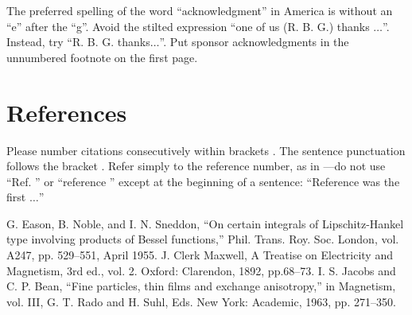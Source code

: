 \documentclass[conference]{IEEEtran}
\begin{document}
The preferred spelling of the word ``acknowledgment'' in America is without 
an ``e'' after the ``g''. Avoid the stilted expression ``one of us (R. B. 
G.) thanks $\ldots$''. Instead, try ``R. B. G. thanks$\ldots$''. Put sponsor 
acknowledgments in the unnumbered footnote on the first page.

\section*{References}

Please number citations consecutively within brackets \cite{b1}. The 
sentence punctuation follows the bracket \cite{b2}. Refer simply to the reference 
number, as in \cite{b3}---do not use ``Ref. \cite{b3}'' or ``reference \cite{b3}'' except at 
the beginning of a sentence: ``Reference \cite{b3} was the first $\ldots$''


\begin{thebibliography}{00}
 G. Eason, B. Noble, and I. N. Sneddon, ``On certain integrals of Lipschitz-Hankel type involving products of Bessel functions,'' Phil. Trans. Roy. Soc. London, vol. A247, pp. 529--551, April 1955.
 J. Clerk Maxwell, A Treatise on Electricity and Magnetism, 3rd ed., vol. 2. Oxford: Clarendon, 1892, pp.68--73.
 I. S. Jacobs and C. P. Bean, ``Fine particles, thin films and exchange anisotropy,'' in Magnetism, vol. III, G. T. Rado and H. Suhl, Eds. New York: Academic, 1963, pp. 271--350.

\end{thebibliography}
\end{document}
